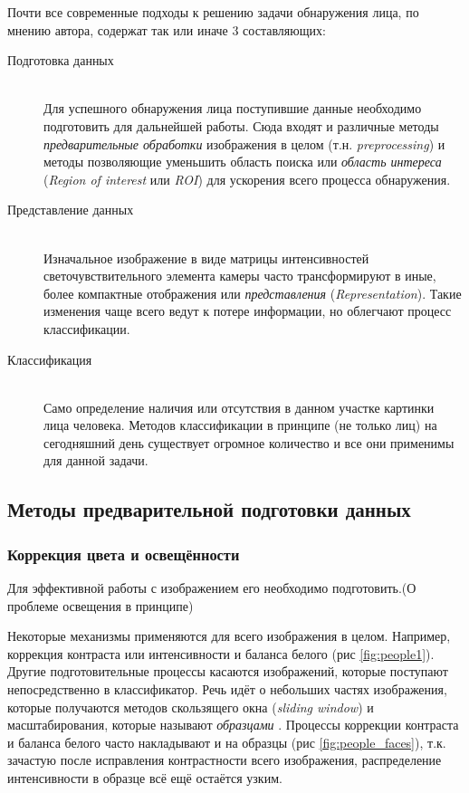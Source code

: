 \documentclass[12pt]{report}
\begin{document}
Почти все современные подходы к решению задачи обнаружения лица, по мнению автора, содержат так или иначе 3 
составляющих:

\begin{description}

\item[Подготовка данных]\hfill \\
	Для успешного обнаружения лица поступившие данные необходимо подготовить для дальнейшей работы. Сюда входят и 
различные методы \emph{предварительные обработки} изображения в целом (т.н. \textit{preprocessing}) и методы 
позволяющие уменьшить область поиска или \emph{область интереса} (\textit{Region of interest} или \textit{ROI}) для 
ускорения всего процесса обнаружения.
\item[Представление данных]\hfill \\ 
	Изначальное изображение в виде матрицы интенсивностей светочувствительного элемента камеры часто трансформируют в 
иные, более компактные отображения или \emph{представления} (\textit{Representation}). Такие изменения чаще всего 
ведут к потере информации, но облегчают процесс классификации.
\item[Классификация]\hfill \\ 
	Само определение наличия или отсутствия в данном участке картинки лица человека. Методов классификации в принципе 
(не только лиц) на сегодняшний день существует огромное количество и все они применимы для данной задачи.
\end{description}

\subsection{Методы предварительной подготовки данных}
\subsubsection{Коррекция цвета и освещённости}
\label{sec:preprocessing_theor}
Для эффективной работы с изображением его необходимо подготовить.(О проблеме освещения в принципе)

Некоторые механизмы применяются для всего изображения в целом. Например, коррекция контраста или интенсивности и 
баланса белого (рис \ref{fig:people1}). Другие подготовительные процессы касаются изображений, которые поступают 
непосредственно в классификатор. Речь идёт о небольших частях изображения, которые получаются методов скользящего 
окна (\textit{sliding window}) и масштабирования, которые называют \emph{образцами} %
. 
Процессы коррекции контраста и баланса белого часто накладывают и на образцы (рис \ref{fig:people_faces}), т.к. 
зачастую после исправления контрастности всего изображения, распределение интенсивности в образце всё ещё остаётся 
узким.
\end{document}
